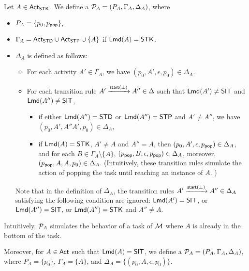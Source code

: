 Let $A \in {\sf Act}_{\sf STK}$. 
We define a {\PDS} ${\mathcal{P} }_{A} = (P_A, \Gamma_{A}, \Delta_{A})$, where 
\begin{itemize}
\item $P_A = \{p_0, p_{\mathsf{pop}}\}$, 
\item $\Gamma_{A} = {\sf Act}_{{\sf STD}} \cup {\sf Act}_{{\sf STP}} \cup \{A\}$ if ${\sf Lmd}(A) = {\sf STK}$.
\item $\Delta_{A}$ is defined as follows: 
\begin{itemize}
%
\item For each activity $A' \in \Gamma_A $, we have $(p_0, A', \epsilon, p_0) \in \Delta_{A}$.
%
\item For each transition rule $A' \xrightarrow{{\mathsf{start} }(\bot)} A'' \in \Delta$ such that ${\sf Lmd}(A') \neq {\sf SIT}$ and ${\sf Lmd}(A'') \neq  {\sf SIT}$, 
\begin{itemize}
    \item if either ${\sf Lmd}(A'') = \mathsf{STD}$ or ${\sf Lmd}(A'') = {\sf STP}$ and $A' \neq A''$, we have $(p_0, A', A''A', p_0) \in \Delta_{A}$,    
    \item if ${\sf Lmd}(A) = {\sf STK}$, $A' \neq A$ and $A'' = A$, then $(p_0, A', \epsilon, p_{\mathsf{pop}}) \in \Delta_{A}$, and for each $B \in \Gamma_{A} \setminus \{A\}$, $(p_{\mathsf{pop}}, B, \epsilon, p_{\mathsf{pop}}) \in \Delta_{A}$, moreover, $(p_{\mathsf{pop}}, A, A, p_0) \in \Delta_{A}$. (Intuitively, these transition rules simulate the action of popping the task until reaching an instance of $A$. )
\end{itemize}
\end{itemize}
Note that in the definition of $\Delta_{A}$, the transition rules $A' \xrightarrow{{\mathsf{start} }(\bot)} A'' \in \Delta_A$ satisfying the following condition are ignored: ${\sf Lmd}(A') = {\sf SIT}$, or ${\sf Lmd}(A'') = {\sf SIT}$, or ${\sf Lmd}(A'') = {\sf STK}$ and $A'' \neq A$. 
\end{itemize}
Intuitively, ${\mathcal{P} }_{A}$ simulates the behavior of a task of ${\mathcal{M} }$ where $A$ is already in the bottom of the task. 

Moreover, for $A \in {\sf Act}$ such that ${\sf Lmd}(A) = {\sf SIT}$, we define a {\PDS} ${\mathcal{P} }_A  = (P_A, \Gamma_A, \Delta_A)$, where $P_A = \{p_0\}$, $\Gamma_A = \{A\}$, and $\Delta_A = \{(p_0, A, \epsilon, p_0)\}$.



